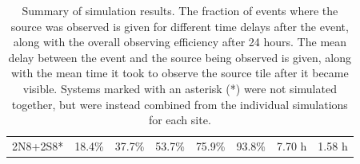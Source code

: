 \begin{colsection}
\begin{table}[p]
\begin{center}
\begin{tabular}{c|cccc|c|cc}
            2N8+2S8* & 18.4\% & 37.7\% & 53.7\% & 75.9\% & 93.8\% &  7.70 h & 1.58 h \\
        \end{tabular}
    \end{center}
    \caption[GW simulation results summary table]{
        Summary of simulation results. The fraction of events where the source was observed is given for different time delays after the event, along with the overall observing efficiency after 24 hours. The mean delay between the event and the source being observed is given, along with the mean time it took to observe the source tile after it became visible. Systems marked with an asterisk (*) were not simulated together, but were instead combined from the individual simulations for each site.
    }\label{tab:gw_sim_results}
\end{table}

\clearpage

\end{colsection}


